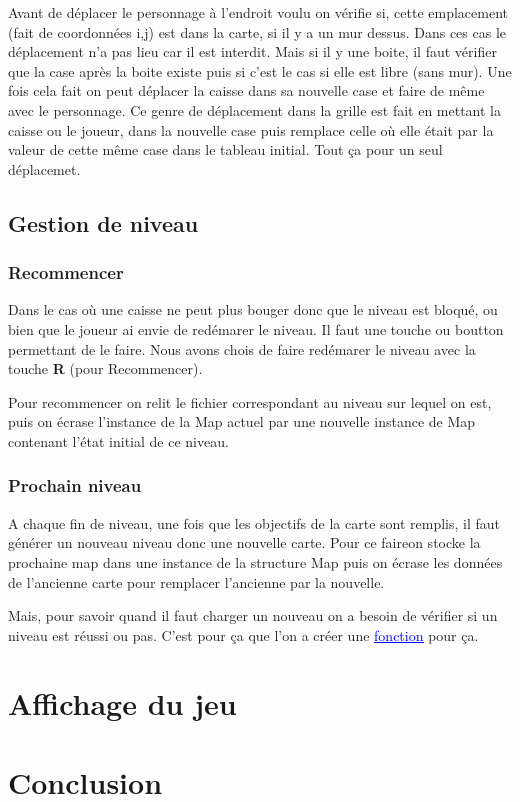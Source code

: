 \documentclass[french, 12pt]{article}
\begin{document}
        Avant de déplacer le personnage à l'endroit voulu on vérifie si, cette emplacement (fait de coordonnées i,j) est dans la carte, si il y a un mur dessus. Dans ces cas le déplacement n'a pas lieu car il est interdit. Mais si il y une boite, il faut vérifier que la case après la boite existe puis si c'est le cas si elle est libre (sans mur). Une fois cela fait on peut déplacer la caisse dans sa nouvelle case et faire de même avec le personnage. Ce genre de déplacement dans la grille est fait en mettant la caisse ou le joueur, dans la nouvelle case puis remplace celle où elle était par la valeur de cette même case dans le tableau initial.
        Tout ça pour un seul déplacemet.

    \subsection{Gestion de niveau}
        \subsubsection{Recommencer}
        Dans le cas où une caisse ne peut plus bouger donc que le niveau est bloqué, ou bien que le joueur ai envie de redémarer le niveau. Il faut une touche ou boutton permettant de le faire. 
        Nous avons chois de faire redémarer le niveau avec la touche \textbf{R} (pour Recommencer).

        Pour recommencer on relit le fichier correspondant au niveau sur lequel on est, puis on écrase l'instance de la Map actuel par une nouvelle instance de Map contenant l'état initial de ce niveau.

        \subsubsection{Prochain niveau}

        A chaque fin de niveau, une fois que les objectifs de la carte sont remplis, il faut générer un nouveau niveau donc une nouvelle carte. 
        Pour ce faireon stocke la prochaine map dans une instance de la structure Map puis on écrase les données de l'ancienne carte pour remplacer l'ancienne par la nouvelle.

        Mais, pour savoir quand il faut charger un nouveau on a besoin de vérifier si un niveau est réussi ou pas. C'est pour ça que l'on a créer une \href{../doc/html/move_8h.html}{\textcolor{blue}{\underline{fonction}}} pour ça.


\section{Affichage du jeu}

\section{Conclusion}
\end{document}
